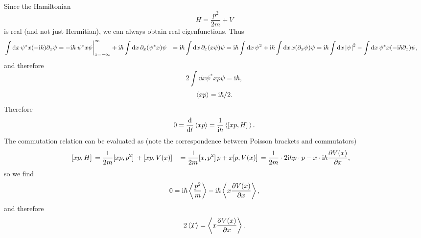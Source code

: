 \documentclass[hyperref, a4paper]{article}
\newcommand*{\ii}{\mathrm{i}}
\def\\{}%
\begin{document}
\subsection{}

Since the Hamiltonian 
\begin{equation}
    H = \frac{p^2}{2m} + V 
\end{equation}
is real (and not just Hermitian), 
we can always obtain real eigenfunctions.
Thus
\[
    \begin{aligned}
        \int \dd{x} \psi^* x (- \ii \hbar) \partial_x \psi 
        &= - \ii \hbar \eval{\psi^* x \psi}^{\infty}_{x = - \infty}
        + \ii \hbar \int \dd{x} \partial_x (\psi^* x) \psi \\
        &= \ii \hbar \int \dd{x} \partial_x(x \psi) \psi 
        = \ii \hbar \int \dd{x} \psi^2 + \ii \hbar \int \dd{x} x (\partial_x \psi) \psi \\
        &= \ii \hbar \int \dd{x} \abs{\psi}^2 
        - \int \dd{x} \psi^* x (- \ii \hbar \partial_x) \psi ,
    \end{aligned}
\]
and therefore 
\[
    2 \int \dd{x} \psi^* x p \psi = \ii \hbar ,
\]
\begin{equation}
    \expval{x p} =  \ii \hbar / 2.
\end{equation}
Therefore 
\[
    0 = \dv{t} \expval{xp}
    = \frac{1}{\ii \hbar} \expval{\comm*{xp}{H}}.
\]
The commutation relation can be evaluated as 
(note the correspondence between Poisson brackets 
and commutators)
\[
    \begin{aligned}
        \comm*{xp}{H} &= \frac{1}{2m} \comm*{xp}{p^2} + \comm*{xp}{V(x)} \\
        &= \frac{1}{2m} \comm*{x}{p^2} p + x \comm*{p}{V(x)} \\
        &= \frac{1}{2m} \cdot 2 \ii \hbar p \cdot p 
        - x \cdot \ii \hbar \pdv{V(x)}{x},
    \end{aligned}
\]
so we find 
\[
    0 = \ii \hbar \expval{\frac{p^2}{m}} - \ii \hbar \expval{x \pdv{V(x)}{x}},
\]
and therefore
\begin{equation}
    2 \expval{T} = \expval{x \pdv{V(x)}{x}}.
\end{equation}

\subsection{}
\end{document}
